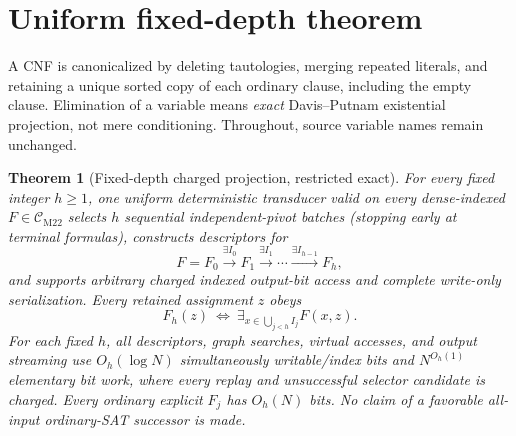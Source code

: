 \documentclass[11pt]{article}
\newtheorem{theorem}{Theorem}
\newcommand{\CM}{\mathcal C_{\mathrm{M22}}}
\begin{document}
\section{Uniform fixed-depth theorem}
A CNF is canonicalized by deleting tautologies, merging repeated literals, and retaining a unique sorted copy of each ordinary clause, including the empty clause.  Elimination of a variable means \emph{exact} Davis--Putnam existential projection, not mere conditioning.  Throughout, source variable names remain unchanged.

\begin{theorem}[Fixed-depth charged projection, restricted exact]
For every \emph{fixed} integer \(h\ge 1\), one uniform deterministic transducer valid on every dense-indexed \(F\in\CM\) selects \(h\) sequential independent-pivot batches (stopping early at terminal formulas), constructs descriptors for
\[
 F=F_0\stackrel{\exists I_0}{\longrightarrow}F_1
 \stackrel{\exists I_1}{\longrightarrow}\cdots
 \stackrel{\exists I_{h-1}}{\longrightarrow}F_h,
\]
and supports arbitrary \emph{charged} indexed output-bit access and complete write-only serialization. Every retained assignment \(z\) obeys
\[
 F_h(z)\ \Longleftrightarrow\
 \exists_{x\in \bigcup_{j<h}I_j}F(x,z).
\]
For each fixed \(h\), all descriptors, graph searches, virtual accesses, and output streaming use \(O_h(\log N)\) simultaneously writable/index bits and \(N^{O_h(1)}\) elementary bit work, where every replay and unsuccessful selector candidate is charged.  Every ordinary explicit \(F_j\) has \(O_h(N)\) bits.  No claim of a favorable all-input ordinary-SAT successor is made.
\end{theorem}
\end{document}
